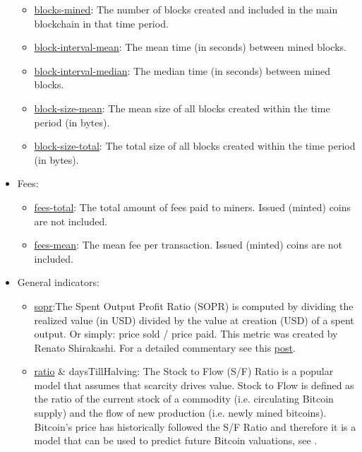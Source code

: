 \begin{itemize}
\begin{itemize}
        \item \href{https://studio.glassnode.com/metrics?a=BTC&m=blockchain.BlockCount}{blocks-mined}: The number of blocks created and included in the main blockchain in that time period.
        \item \href{https://studio.glassnode.com/metrics?a=BTC&m=blockchain.BlockIntervalMean}{block-interval-mean}: The mean time (in seconds) between mined blocks.
        \item \href{https://studio.glassnode.com/metrics?a=BTC&m=blockchain.BlockIntervalMedian}{block-interval-median}: The median time (in seconds) between mined blocks.
        \item \href{https://studio.glassnode.com/metrics?a=BTC&m=blockchain.BlockSizeMean}{block-size-mean}: The mean size of all blocks created within the time period (in bytes).
        \item \href{https://studio.glassnode.com/metrics?a=BTC&m=blockchain.BlockSizeSum}{block-size-total}: The total size of all blocks created within the time period (in bytes).
    \end{itemize}
    \item Fees:
    \begin{itemize}
        \item \href{https://studio.glassnode.com/metrics?a=BTC&m=fees.VolumeSum}{fees-total}: The total amount of fees paid to miners. Issued (minted) coins are not included.
        \item \href{https://studio.glassnode.com/metrics?a=BTC&m=fees.VolumeMean}{fees-mean}: The mean fee per transaction. Issued (minted) coins are not included.
    \end{itemize}
    \item General indicators:
    \begin{itemize}
        \item \href{https://studio.glassnode.com/metrics?a=BTC&m=indicators.Sopr}{sopr}:The Spent Output Profit Ratio (SOPR) is computed by dividing the realized value (in USD) divided by the value at creation (USD) of a spent output. Or simply: price sold / price paid. This metric was created by Renato Shirakashi. For a detailed commentary see this \href{https://medium.com/unconfiscatable/introducing-sopr-spent-outputs-to-predict-bitcoin-lows-and-tops-ceb4536b3b9}{post}.
        \item \href{https://studio.glassnode.com/metrics?a=BTC&m=indicators.StockToFlowRatio}{ratio} \& daysTillHalving: The Stock to Flow (S/F) Ratio is a popular model that assumes that scarcity drives value. Stock to Flow is defined as the ratio of the current stock of a commodity (i.e. circulating Bitcoin supply) and the flow of new production (i.e. newly mined bitcoins). Bitcoin's price has historically followed the S/F Ratio and therefore it is a model that can be used to predict future Bitcoin valuations, see \cite{bitcoin_stock_to_flow}.

\end{itemize}
\end{itemize}
